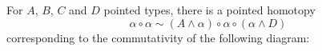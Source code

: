 \documentclass{article}
\newcommand{\smsh}{\wedge}
\renewcommand{\o}{\ensuremath{\circ}}
\begin{document}
\begin{thm}\label{thm:smash-associativity-pentagon}
	For $A$, $B$, $C$ and $D$ pointed types, there is a pointed homotopy
	\[\alpha \o \alpha \sim (A \smsh \alpha) \o \alpha \o (\alpha \smsh D)\]
	corresponding to the commutativity of the following diagram:
	\begin{center}
	\end{center}
\end{thm}
\end{document}
